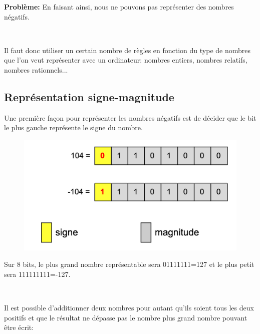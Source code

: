 \documentclass[11pt, a4paper]{book}
\begin{document}
{\bf Problème:} En faisant ainsi, nous ne pouvons pas représenter des nombres négatifs.

\ 

Il faut donc utiliser un certain nombre de règles en fonction du type de nombres que l'on veut représenter avec un ordinateur: nombres entiers, nombres relatifs, nombres rationnels...





\subsection{Représentation signe-magnitude}

Une première façon pour représenter les nombres négatifs est de décider que le bit le plus gauche représente le signe du nombre.

\begin{figure}[h]
\begin{center}
\includegraphics[scale=.5]{images/nombresigne}
\end{center}
\end{figure}

Sur 8 bits, le plus grand nombre représentable sera 01111111=127 et le plus petit sera 111111111=-127.

\ 

Il est possible d'additionner deux nombres pour autant qu'ils soient tous les deux positifs et que le résultat ne dépasse pas le nombre plus grand nombre pouvant être écrit:
\end{document}
